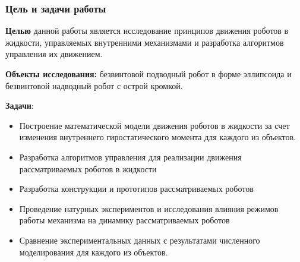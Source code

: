 \begin{frame}
\frametitle{Цель и задачи работы}

\textbf{Целью} данной работы является исследование принципов движения роботов в жидкости, управляемых внутренними механизмами и разработка алгоритмов управления их движением.


\textbf{Объекты исследования:} безвинтовой подводный робот в форме эллипсоида и безвинтовой надводный робот с острой кромкой.


\textbf{Задачи}:
\begin{itemize}
	\item Построение математической модели движения роботов в жидкости за счет изменения внутреннего гиростатического момента для каждого из объектов. %
	\item Разработка алгоритмов управления для реализации движения рассматриваемых роботов в жидкости%
	\item Разработка конструкции и прототипов рассматриваемых роботов%
	\item Проведение натурных экспериментов и исследования влияния режимов работы механизма на динамику рассматриваемых роботов%
	\item Сравнение экспериментальных данных с результатами численного моделирования для каждого из объектов. %
\end{itemize}
\end{frame}


